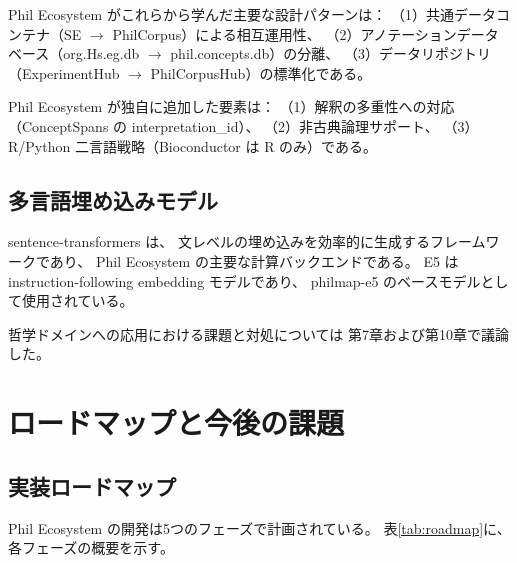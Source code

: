 \documentclass[a4paper,11pt]{ltjsarticle}
\begin{document}
Phil Ecosystem がこれらから学んだ主要な設計パターンは：
（1）共通データコンテナ（SE $\to$ PhilCorpus）による相互運用性、
（2）アノテーションデータベース（org.Hs.eg.db $\to$ phil.concepts.db）の分離、
（3）データリポジトリ（ExperimentHub $\to$ PhilCorpusHub）の標準化である。

Phil Ecosystem が独自に追加した要素は：
（1）解釈の多重性への対応（ConceptSpans の interpretation\_id）、
（2）非古典論理サポート、
（3）R/Python 二言語戦略（Bioconductor は R のみ）である。

\subsection{多言語埋め込みモデル}

sentence-transformers\cite{reimers2019} は、
文レベルの埋め込みを効率的に生成するフレームワークであり、
Phil Ecosystem の主要な計算バックエンドである。
E5\cite{wang2022e5} は instruction-following embedding モデルであり、
philmap-e5 のベースモデルとして使用されている。

哲学ドメインへの応用における課題と対処については
第7章および第10章で議論した。


\section{ロードマップと今後の課題}\label{sec:roadmap}

\subsection{実装ロードマップ}

Phil Ecosystem の開発は5つのフェーズで計画されている。
表\ref{tab:roadmap}に、各フェーズの概要を示す。
\end{document}
